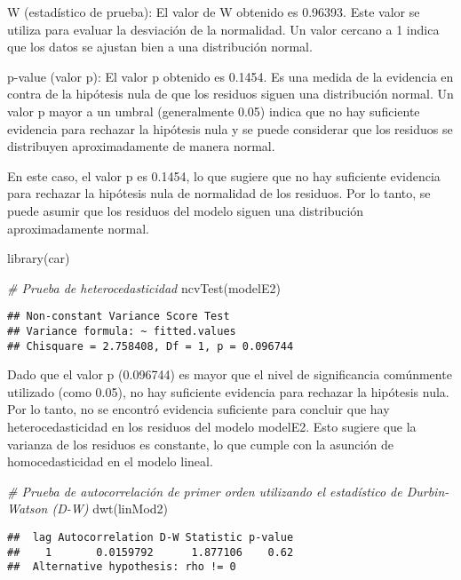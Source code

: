 \documentclass[
]{article}
\newenvironment{Shaded}{\begin{snugshade}}{\end{snugshade}}
\newcommand{\CommentTok}[1]{\textcolor[rgb]{0.56,0.35,0.01}{\textit{#1}}}
\newcommand{\FunctionTok}[1]{\textcolor[rgb]{0.00,0.00,0.00}{#1}}
\newcommand{\NormalTok}[1]{#1}
\begin{document}
W (estadístico de prueba): El valor de W obtenido es 0.96393. Este valor
se utiliza para evaluar la desviación de la normalidad. Un valor cercano
a 1 indica que los datos se ajustan bien a una distribución normal.

p-value (valor p): El valor p obtenido es 0.1454. Es una medida de la
evidencia en contra de la hipótesis nula de que los residuos siguen una
distribución normal. Un valor p mayor a un umbral (generalmente 0.05)
indica que no hay suficiente evidencia para rechazar la hipótesis nula y
se puede considerar que los residuos se distribuyen aproximadamente de
manera normal.

En este caso, el valor p es 0.1454, lo que sugiere que no hay suficiente
evidencia para rechazar la hipótesis nula de normalidad de los residuos.
Por lo tanto, se puede asumir que los residuos del modelo siguen una
distribución aproximadamente normal.

\begin{Shaded}
\begin{Highlighting}[]
\FunctionTok{library}\NormalTok{(car)}

\CommentTok{\# Prueba de heterocedasticidad }
\FunctionTok{ncvTest}\NormalTok{(modelE2)}
\end{Highlighting}
\end{Shaded}

\begin{verbatim}
## Non-constant Variance Score Test 
## Variance formula: ~ fitted.values 
## Chisquare = 2.758408, Df = 1, p = 0.096744
\end{verbatim}

Dado que el valor p (0.096744) es mayor que el nivel de significancia
comúnmente utilizado (como 0.05), no hay suficiente evidencia para
rechazar la hipótesis nula. Por lo tanto, no se encontró evidencia
suficiente para concluir que hay heterocedasticidad en los residuos del
modelo modelE2. Esto sugiere que la varianza de los residuos es
constante, lo que cumple con la asunción de homocedasticidad en el
modelo lineal.

\begin{Shaded}
\begin{Highlighting}[]
\CommentTok{\#  Prueba de autocorrelación de primer orden utilizando el estadístico de Durbin{-}Watson (D{-}W)}
\FunctionTok{dwt}\NormalTok{(linMod2)}
\end{Highlighting}
\end{Shaded}

\begin{verbatim}
##  lag Autocorrelation D-W Statistic p-value
##    1       0.0159792      1.877106    0.62
##  Alternative hypothesis: rho != 0
\end{verbatim}
\end{document}
